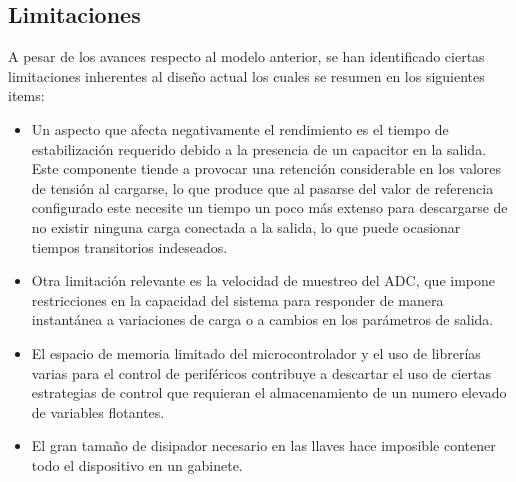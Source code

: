 \subsection{Limitaciones} \label{S:limitaciones} 
A pesar de los avances respecto al modelo anterior, se han identificado ciertas limitaciones inherentes al diseño actual los cuales se resumen en los siguientes items:  
\begin{itemize}
    \item Un aspecto que afecta negativamente el rendimiento es el tiempo de estabilización requerido debido a la presencia de un capacitor en la salida. Este componente tiende a provocar una retención considerable en los valores de tensión al cargarse, lo que produce que al pasarse del valor de referencia configurado este necesite un tiempo un poco más extenso para descargarse de no existir ninguna carga conectada a la salida, lo que puede ocasionar tiempos transitorios indeseados. 
    \item Otra limitación relevante es la velocidad de muestreo del ADC, que impone restricciones en la capacidad del sistema para responder de manera instantánea a variaciones de carga o a cambios en los parámetros de salida.
    \item El espacio de memoria limitado del microcontrolador  y el uso de librerías varias para el control de periféricos contribuye a descartar el uso de ciertas estrategias de control que requieran el almacenamiento de un numero elevado de variables flotantes.   
    \item El gran tamaño de disipador necesario en las llaves hace imposible contener todo el dispositivo en un gabinete.  
\end{itemize}

